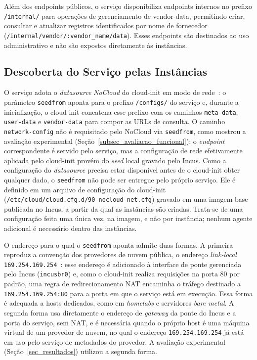 Além dos endpoints públicos, o serviço disponibiliza endpoints internos no prefixo \texttt{/internal/} para operações de gerenciamento de vendor-data, permitindo criar, consultar e atualizar registros identificados por nome de fornecedor (\texttt{/internal/vendor/:vendor\_name/data}). Esses endpoints são destinados ao uso administrativo e não são expostos diretamente às instâncias.

\subsection{Descoberta do Serviço pelas Instâncias}
\label{subsec_descoberta}

O serviço adota o \textit{datasource} \textit{NoCloud} do cloud-init em modo de rede~\citep{cloudinit_nocloud}: o parâmetro \texttt{seedfrom} aponta para o prefixo \texttt{/configs/} do serviço e, durante a inicialização, o cloud-init concatena esse prefixo com os caminhos \texttt{meta-data}, \texttt{user-data} e \texttt{vendor-data} para compor as URLs de consulta. O caminho \texttt{network-config} não é requisitado pelo NoCloud via \texttt{seedfrom}, como mostrou a avaliação experimental (Seção~\ref{subsec_avaliacao_funcional}): o \textit{endpoint} correspondente é servido pelo serviço, mas a configuração de rede efetivamente aplicada pelo cloud-init provém do \textit{seed} local gravado pelo Incus. Como a configuração do \textit{datasource} precisa estar disponível antes de o cloud-init obter qualquer dado, o \texttt{seedfrom} não pode ser entregue pelo próprio serviço. Ele é definido em um arquivo de configuração do cloud-init (\texttt{/etc/cloud/cloud.cfg.d/90-nocloud-net.cfg}) gravado em uma imagem-base publicada no Incus, a partir da qual as instâncias são criadas. Trata-se de uma configuração feita uma única vez, na imagem, e não por instância; nenhum agente adicional é necessário dentro das instâncias.

O endereço para o qual o \texttt{seedfrom} aponta admite duas formas. A primeira reproduz a convenção dos provedores de nuvem pública, o endereço \textit{link-local} \texttt{169.254.169.254}~\citep{aws_imds, gcp_metadata}: esse endereço é adicionado à interface de ponte gerenciada pelo Incus (\texttt{incusbr0}) e, como o cloud-init realiza requisições na porta 80 por padrão, uma regra de redirecionamento NAT encaminha o tráfego destinado a \texttt{169.254.169.254:80} para a porta em que o serviço está em execução. Essa forma é adequada a hosts dedicados, como em \textit{homelabs} e servidores \textit{bare metal}. A segunda forma usa diretamente o endereço de \textit{gateway} da ponte do Incus e a porta do serviço, sem NAT, e é necessária quando o próprio host é uma máquina virtual de um provedor de nuvem, no qual o endereço \texttt{169.254.169.254} já está em uso pelo serviço de metadados do provedor. A avaliação experimental (Seção~\ref{sec_resultados}) utilizou a segunda forma.

